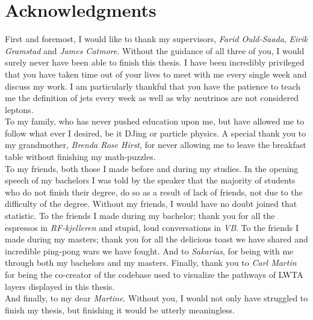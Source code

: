 \chapter*{Acknowledgments}
First and foremost, I would like to thank my supervisors, \emph{Farid Ould-Saada}, \emph{Eirik Gramstad} and \emph{James Catmore}. 
Without the guidance of all three of you, I would surely never have been able to finish this thesis. I have been incredibly
privileged that you have taken time out of your lives to meet with me every single week and discuss my work. 
I am particularly thankful that you have the patience to teach me the definition of jets every week as well as
why neutrinos are not considered leptons.
\\\newline
To my family, who has never pushed education upon me, but have allowed me to follow what ever I desired, be it DJing or 
particle physics. A special thank you to my grandmother, \emph{Brenda Rose Hirst}, for never allowing me to leave the breakfast table 
without finishing my math-puzzles.
\\\newline
To my friends, both those I made before and during my studies. In the opening speech of my bachelors I was told by the speaker that 
the majority of students who do not finish their degree, do so as a result of lack of friends, not due to the difficulty of the degree.
Without my friends, I would have no doubt joined that statistic. To the friends I made during my bachelor; thank you for all the espressos in \emph{RF-kjelleren}
and stupid, loud conversations in \emph{VB}. To the friends I made during my masters; thank you for all the delicious toast we have shared and 
incredible ping-pong wars we have fought. And to \emph{Sakarias}, for being with me through both my bachelors and my masters. Finally, thank you to 
\emph{Carl Martin} for being the co-creator of the codebase used to visualize the pathways of \acs{LWTA} layers displayed in this thesis. 
\\\newline
And finally, to my dear \emph{Martine}. Without you, I would not only have struggled to finish my thesis, but finishing it would be utterly 
meaningless.